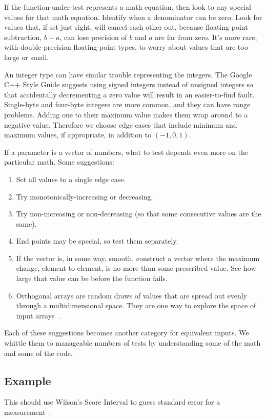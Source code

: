 \documentclass[fleqn,10pt]{olplainarticle}
\begin{document}
If the function-under-test represents a math equation, then
look to any special values for that math equation. Identify
when a denominator can be zero. Look for values that,
if set just right, will cancel each other out, because
floating-point subtraction, $b-a$, can lose precision of
$b$ and $a$ are far from zero. It's more rare, with double-precision
floating-point types, to worry about values that are too
large or small.

An integer type can have similar trouble representing
the integers. The Google C++ Style Guide suggests using
signed integers instead of unsigned integers so that
accidentally decrementing a zero value will result in an
easier-to-find fault. Single-byte and four-byte integers
are more common, and they can have range problems. Adding
one to their maximum value makes them wrap around to a
negative value. Therefore we choose edge cases that include
minimum and maximum values, if appropriate, in addition
to $(-1, 0, 1)$.

If a parameter is a vector of numbers, what to test depends
even more on the particular math. Some suggestions:
\begin{enumerate}
    \item Set all values to a single edge case.
    \item Try monotonically-increasing or decreasing.
    \item Try non-increasing or non-decreasing (so that some
    consecutive values are the same).
    \item End points may be special, so test them separately.
    \item If the vector is, in some way, smooth, construct
    a vector where the maximum change, element to element, is no
    more than some prescribed value. See how large that value can
    be before the function fails.
    \item Orthogonal arrays are random draws of values that
    are spread out evenly through a multidimensional space.
    They are one way to explore the space of input arrays~\citep{Owen1992}.
\end{enumerate}
Each of these suggestions becomes another category for
equivalent inputs. We whittle them to manageable numbers of
tests by understanding some of the math and some of the code.


\subsection{Example}\label{sec:parameter-wilson}
This should use Wilson's Score Interval to guess standard error for a measurement~\citep{agresti1998approximate}.
\end{document}
